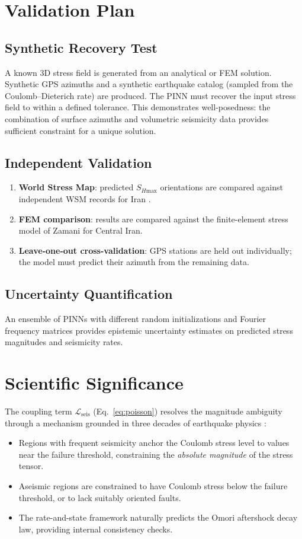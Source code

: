 \documentclass[11pt, a4paper]{article}
\begin{document}
\section{Validation Plan}

\subsection{Synthetic Recovery Test}
A known 3D stress field is generated from an analytical or FEM solution. Synthetic GPS azimuths and a synthetic earthquake catalog (sampled from the Coulomb--Dieterich rate) are produced. The PINN must recover the input stress field to within a defined tolerance. This demonstrates well-posedness: the combination of surface azimuths and volumetric seismicity data provides sufficient constraint for a unique solution.

\subsection{Independent Validation}
\begin{enumerate}
    \item \textbf{World Stress Map}: predicted $S_{H\text{max}}$ orientations are compared against independent WSM records for Iran \cite{Heidbach2018}.
    \item \textbf{FEM comparison}: results are compared against the finite-element stress model of Zamani \cite{Zamani2017} for Central Iran.
    \item \textbf{Leave-one-out cross-validation}: GPS stations are held out individually; the model must predict their azimuth from the remaining data.
\end{enumerate}

\subsection{Uncertainty Quantification}
An ensemble of PINNs with different random initializations and Fourier frequency matrices provides epistemic uncertainty estimates on predicted stress magnitudes and seismicity rates.

\section{Scientific Significance}

The coupling term $\mathcal{L}_{\text{seis}}$ (Eq.~\ref{eq:poisson}) resolves the magnitude ambiguity through a mechanism grounded in three decades of earthquake physics \cite{Dieterich1994}:
\begin{itemize}
    \item Regions with frequent seismicity anchor the Coulomb stress level to values near the failure threshold, constraining the \textit{absolute magnitude} of the stress tensor.
    \item Aseismic regions are constrained to have Coulomb stress below the failure threshold, or to lack suitably oriented faults.
    \item The rate-and-state framework naturally predicts the Omori aftershock decay law, providing internal consistency checks.
\end{itemize}
\end{document}
